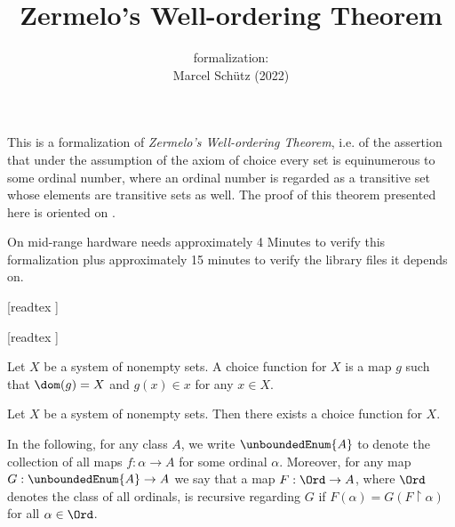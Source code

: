 \documentclass{stex}
\title{Zermelo's Well-ordering Theorem}
\author{\Naproche formalization: \vspace{0.5em} \\
Marcel Schütz (2022)}
\date{}
\begin{document}
  \maketitle

  \noindent This is a formalization of \textit{Zermelo's Well-ordering Theorem},
  i.e. of the assertion that under the assumption of the axiom of choice every
  set is equinumerous to some ordinal number, where an ordinal number is
  regarded as a transitive set whose elements are transitive sets as well.
  The proof of this theorem presented here is oriented on \cite{Koepke2018}.

  On mid-range hardware \Naproche needs approximately 4 Minutes to verify this
  formalization plus approximately 15 minutes to verify the library files it
  depends on.

  \begin{forthel}

    [readtex ]

    [readtex ]

  \end{forthel}

  \begin{forthel}
    \begin{definition*}
      Let $X$ be a system of nonempty sets.
      A choice function for $X$ is a map $g$ such that $\dom(g) = X$ and
      $g(x) \in x$ for any $x \in X$.
    \end{definition*}

    \begin{axiom*}[Choice]
      Let $X$ be a system of nonempty sets.
      Then there exists a choice function for $X$.
    \end{axiom*}
  \end{forthel}

  \noindent In the following, for any class $A$, we write $\unboundedEnum{A}$ to
  denote the collection of all maps $f : \alpha \to A$ for some ordinal
  $\alpha$.
  Moreover, for any map $G : \unboundedEnum{A} \to A$ we say that a map $F : \Ord \to
  A$, where $\Ord$ denotes the class of all ordinals, is recursive regarding $G$
  if $F(\alpha) = G(F \restriction \alpha)$ for all $\alpha \in \Ord$.
\end{document}
